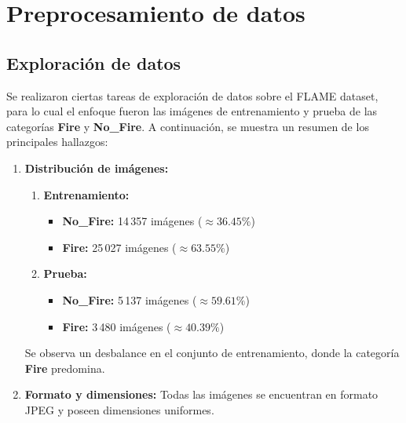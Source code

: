 \section{Preprocesamiento de datos}

\subsection{Exploración de datos}
Se realizaron ciertas tareas de exploración de datos 
sobre el FLAME dataset, para lo cual el enfoque fueron las imágenes de entrenamiento
y prueba de las categorías \textbf{Fire} y \textbf{No\_Fire}. A continuación, se muestra 
un resumen de los principales hallazgos:
\begin{enumerate}
    \item \textbf{Distribución de imágenes:}
      \begin{enumerate}
          \item \textbf{Entrenamiento:}
          \begin{itemize}
              \item \textbf{No\_Fire:} 14\,357 imágenes (\(\approx 36.45\%\))
              \item \textbf{Fire:} 25\,027 imágenes (\(\approx 63.55\%\))
          \end{itemize}
          \item \textbf{Prueba:}
          \begin{itemize}
              \item \textbf{No\_Fire:} 5\,137 imágenes (\(\approx 59.61\%\))
              \item \textbf{Fire:} 3\,480 imágenes (\(\approx 40.39\%\))
          \end{itemize}
      \end{enumerate}
      Se observa un desbalance en el conjunto de entrenamiento, donde la categoría \textbf{Fire} 
      predomina.
      
    \item \textbf{Formato y dimensiones:}  
      Todas las imágenes se encuentran en formato JPEG y poseen dimensiones uniformes. 
    

\end{enumerate}
